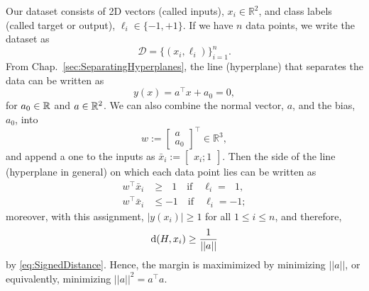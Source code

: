 Our dataset consists of 2D vectors (called inputs), $x_i \in \mathbb{R}^2$, and class labels (called target or output), $\ell_i \in \{-1,+1\}$. If we have $n$ data points, we write the dataset as
$$\mathcal{D} = \{(x_i,\ell_i)\}_{i=1}^n.$$
From Chap.~\ref{sec:SeparatingHyperplanes}, the line (hyperplane) that separates the data can be written as 
$$y(x)= a^\top x + a_0 = 0,$$ for $a_0\in \mathbb R$ and $a \in \mathbb R^2$. We can also combine the normal vector, $a$, and the bias, $a_0$, into 
$$w := \begin{bmatrix} a \\ a_0 \end{bmatrix}^\top \in \mathbb{R}^3,$$ and append a one to the inputs as $\bar{x}_i:=\begin{bmatrix} x_i; 1 \end{bmatrix}$.
Then the side of the line (hyperplane in general) on which each data point lies can be written as
\begin{equation}
\label{eq:InequalityConstraintsMaxMargin}
\begin{aligned}
     w^\top \bar{x}_i &\geq ~~~1 \quad \text{if} \quad \ell_i = ~~~1,\\
     w^\top \bar{x}_i &\leq -1 \quad \text{if} \quad \ell_i = -1;
\end{aligned}    
\end{equation}
moreover, with this assignment, $|y(x_i)|\ge 1$ for all $1 \le i \le n$, and therefore,
$${\rm d}(H, x_i) \ge \frac{1}{||a||}$$
by \eqref{eq:SignedDistance}.  Hence, the margin is maximimized by minimizing $||a||$, or equivalently, minimizing $||a||^2 = a^\top a$.\\


